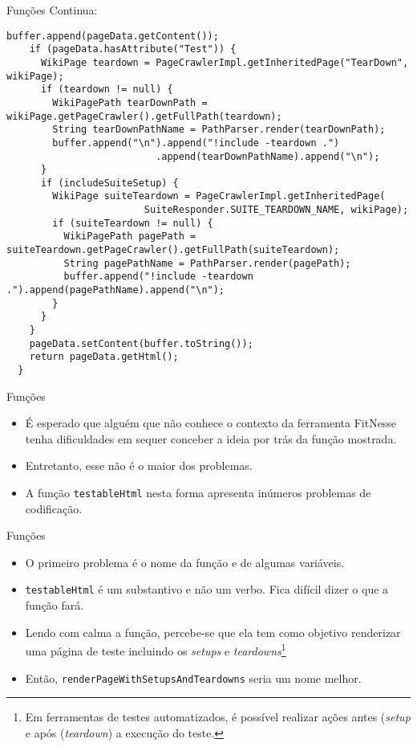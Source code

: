 \documentclass[11pt]{beamer}
\begin{document}
  \begin{frame}[fragile]{Funções}
    Continua:

    \begin{lstlisting}[basicstyle=\tiny]
    buffer.append(pageData.getContent());
    if (pageData.hasAttribute("Test")) {
      WikiPage teardown = PageCrawlerImpl.getInheritedPage("TearDown", wikiPage);
      if (teardown != null) {
        WikiPagePath tearDownPath = wikiPage.getPageCrawler().getFullPath(teardown);
        String tearDownPathName = PathParser.render(tearDownPath);
        buffer.append("\n").append("!include -teardown .")
                          .append(tearDownPathName).append("\n");
      }
      if (includeSuiteSetup) {
        WikiPage suiteTeardown = PageCrawlerImpl.getInheritedPage(
                        SuiteResponder.SUITE_TEARDOWN_NAME, wikiPage);
        if (suiteTeardown != null) {
          WikiPagePath pagePath = suiteTeardown.getPageCrawler().getFullPath(suiteTeardown);
          String pagePathName = PathParser.render(pagePath);
          buffer.append("!include -teardown .").append(pagePathName).append("\n");
        }
      }
    }
    pageData.setContent(buffer.toString());
    return pageData.getHtml();
  }
    \end{lstlisting}
  \end{frame}

  \begin{frame}[fragile]{Funções}
    \begin{itemize}
      \item É esperado que alguém que não conhece o contexto da ferramenta FitNesse tenha dificuldades em sequer conceber a ideia por trás da função mostrada.
      \item Entretanto, esse não é o maior dos problemas.
      \item A função \verb|testableHtml| nesta forma apresenta inúmeros problemas de codificação. 
    \end{itemize}
  \end{frame}

  \begin{frame}[fragile]{Funções}
    \begin{itemize}
      \item O primeiro problema é o nome da função e de algumas variáveis.
      \item \verb|testableHtml| é um substantivo e não um verbo. Fica difícil dizer o que a função fará.
      \item Lendo com calma a função, percebe-se que ela tem como objetivo renderizar uma página de teste incluindo os \textit{setups} e \textit{teardowns}\footnote{Em ferramentas de testes automatizados, é possível realizar ações antes (\textit{setup} e após (\textit{teardown}) a execução do teste.}
      \item Então, \verb|renderPageWithSetupsAndTeardowns| seria um nome melhor.
    \end{itemize}
  \end{frame}
\end{document}

